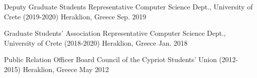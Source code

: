 \begin{cvhonors}
  \cvhonor
    {Deputy Graduate Students Representative} %
    {Computer Science Dept., University of Crete (2019-2020)} %
    {Heraklion, Greece} %
    {Sep. 2019} %

  \cvhonor
    {Graduate Students' Association Representative} %
    {Computer Science Dept., University of Crete (2018-2020)} %
    {Heraklion, Greece} %
    {Jan. 2018} %

  \cvhonor
    {Public Relation Officer} %
    {Board Council of the Cypriot Students' Union (2012-2015)} %
    {Heraklion, Greece} %
    {May 2012} %

\end{cvhonors}

